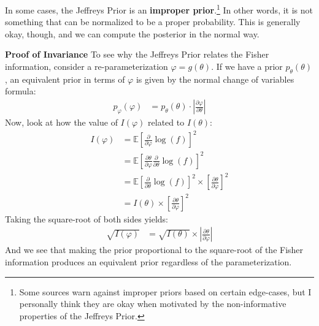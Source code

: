 \documentclass{tufte-handout}
\begin{document}
In some cases, the Jeffreys Prior is an \textbf{improper prior}.\footnote{
  Some sources warn against improper priors based on certain edge-cases,
  but I personally think they are okay when motivated by the non-informative
  properties of the Jeffreys Prior.
}
In other
words, it is not something that can be normalized to be a proper probability.
This is generally okay, though, and we can compute the posterior in the 
normal way.

\newpage

\noindent
\textbf{Proof of Invariance}
To see why the Jeffreys Prior relates the Fisher information, consider a
re-parameterization $\varphi = g(\theta)$. If we have a prior $p_\theta(\theta)$,
an equivalent prior in terms of $\varphi$ is given by the normal change of
variables formula:
\begin{align*}
p_\varphi(\varphi) &= p_\theta(\theta) \cdot \left| \frac{\partial \varphi}{\partial \theta} \right|
\end{align*}
Now, look at how the value of $I(\varphi)$ related to $I(\theta)$:
\begin{align*}
I(\varphi) &= \mathbb{E} \left[ \frac{\partial}{\partial \varphi} \log(f) \right]^2 \\
&= \mathbb{E} \left[ \frac{\partial \theta}{\partial \varphi} \frac{\partial}{\partial \theta}  \log(f) \right]^2 \\
&= \mathbb{E} \left[ \frac{\partial}{\partial \theta}  \log(f) \right]^2 \times \left[ \frac{\partial \theta}{\partial \varphi}\right]^2 \\
&= I(\theta) \times \left[ \frac{\partial \theta}{\partial \varphi}\right]^2
\end{align*}
Taking the square-root of both sides yields:
\begin{align*}
\sqrt{I(\varphi)} &= \sqrt{I(\theta)} \times \left| \frac{\partial \theta}{\partial \varphi}\right|
\end{align*}
And we see that making the prior proportional to the square-root of the Fisher
information produces an equivalent prior regardless of the parameterization.
\end{document}
